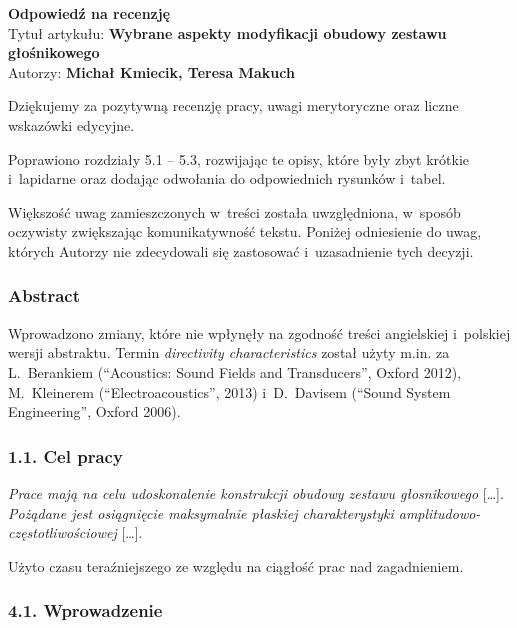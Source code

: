 \documentclass[12pt]{article}
\begin{document}
    
    \begin{center}
        \textbf{Odpowiedź na recenzję }\\
        \vspace{10pt}
        Tytuł artykułu: \textbf{Wybrane aspekty modyfikacji obudowy zestawu głośnikowego} \\
        Autorzy: \textbf{Michał Kmiecik, Teresa Makuch}
    \end{center}
    

    Dziękujemy za pozytywną recenzję pracy, uwagi merytoryczne oraz liczne wskazówki edycyjne.
    
    Poprawiono rozdziały 5.1 -- 5.3, rozwijając te opisy, które były zbyt krótkie i~lapidarne oraz dodając odwołania do odpowiednich rysunków i~tabel.
    
    Większość uwag zamieszczonych w~treści została uwzględniona, w~sposób oczywisty zwiększając komunikatywność tekstu. Poniżej odniesienie do uwag, których Autorzy nie zdecydowali się zastosować i~uzasadnienie tych decyzji.
    
    \subsubsection*{Abstract}
    
    Wprowadzono zmiany, które nie wpłynęły na zgodność treści angielskiej i~polskiej wersji abstraktu. Termin \textit{directivity characteristics} został użyty m.in. za L.~Berankiem (\textquotedblleft Acoustics: Sound Fields and Transducers\textquotedblright, Oxford 2012), M.~Kleinerem (\textquotedblleft Electroacoustics\textquotedblright, 2013) i~D.~Davisem (\textquotedblleft Sound System Engineering\textquotedblright, Oxford 2006).
    
    \subsubsection*{1.1. Cel pracy}
    
    \textit{Prace mają na celu udoskonalenie konstrukcji obudowy zestawu głosnikowego} [\dots]. \textit{Pożądane jest osiągnięcie maksymalnie
    płaskiej charakterystyki amplitudowo-częstotliwościowej} [\dots].
    
    Użyto czasu teraźniejszego ze względu na ciągłość prac nad zagadnieniem.
    
    \subsubsection*{4.1. Wprowadzenie}
    
\end{document}
